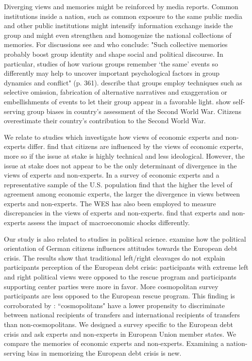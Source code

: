 Diverging views and memories might be reinforced 
by media reports. Common
institutions inside a nation, such as common exposure to the same public
media and other public institutions might intensify information exchange
inside the group
and might even strengthen and homogenize the national collections of
memories. For discussions see \cite{rigney} and \cite{roedigerabel} who conclude: "Such collective memories probably boost group identity
and shape social and political discourse. In particular, studies of how
various groups remember `the same' events so differently may help to uncover
important psychological factors in group dynamics and conflict" (p. 361). \cite{baumeister} describe that groups employ techniques such as selective omission, fabrication of alternative narratives and exaggeration or embellishments of events to let their group appear in a favorable light. \cite{abel} show self-serving group biases in country's assessment of the Second World War. Citizens overestimate their country's contribution to the Second World War. 

We relate to studies which investigate how views of economic experts and non-experts differ. \cite{johnston} find that citizens are influenced by the views of economic experts, more so if the issue at stake is highly technical and less ideological. However, the issue at stake does not appear to be the only determinant of divergence in the views of experts and non-experts. In a survey of economic experts and a representative sample of the U.S. population \cite{sapienza} find that the higher the level of agreement among economic experts, the larger the divergence in views between experts and non-experts. The WES has also been employed to measure discrepancies in the views of experts and non-experts. \cite{roth} find that experts and non-experts assess the impact of macroeconomic shocks differently.

Our study is also related to studies in political science.
\cite{bechtel} examine how the political orientation of German citizens influences attitudes towards the European debt crisis. The results show that traditional left/right cleavages do not explain participants perception of the European debt crisis: participants with extreme left and right political views were opposed to the rescue program and participants supporting center parties were more in favor. More cosmopolitan survey participants are less opposed to the European rescue program. This finding is corroborated by \cite{kuhn}: ``cosmopolitans" have a lower propensity to discriminate between national recipients of transfers and international recipients of transfers than non-cosmopolitans. We designed a survey specific to the European debt crisis and ask experts and non-experts in European Union member states. We compare the memories of economic experts and non-experts. Examining a nation-serving bias in memorizing the European debt crisis is new. 


